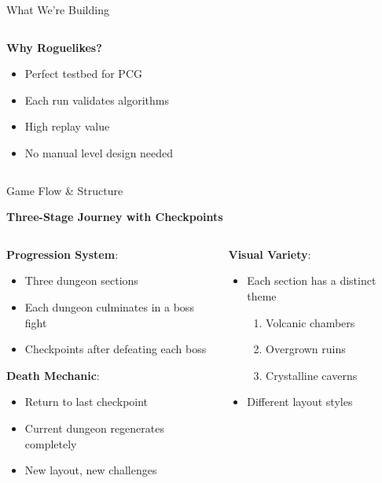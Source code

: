 \documentclass{beamer}
\begin{document}
\begin{frame}{What We're Building}
\begin{columns}[T]
\begin{column}{0.48\textwidth}
            \vspace{0.3cm}
            \textbf{Why Roguelikes?}
            \begin{itemize}
                \item Perfect testbed for PCG
                \item Each run validates algorithms
                \item High replay value
                \item No manual level design needed
            \end{itemize}
        \end{column}
    \end{columns}
\end{frame}

\begin{frame}{Game Flow \& Structure}
    \begin{center}
        \textbf{Three-Stage Journey with Checkpoints}
    \end{center}

    \begin{columns}[T]
        \begin{column}{0.48\textwidth}
            \textbf{Progression System}:
            \begin{itemize}
                \item Three dungeon sections
                \item Each dungeon culminates in a boss fight
                \item Checkpoints after defeating each boss
            \end{itemize}

            \vspace{0.35cm}
            \textbf{Death Mechanic}:
            \begin{itemize}
                \item Return to last checkpoint
                \item \textcolor{ubburgundy}{Current dungeon regenerates completely}
                \item New layout, new challenges
            \end{itemize}
        \end{column}

        \begin{column}{0.48\textwidth}
            \textbf{Visual Variety}:
            \begin{itemize}
                \item Each section has a distinct theme
                \begin{enumerate}
                    \item Volcanic chambers
                    \item Overgrown ruins
                    \item Crystalline caverns
                \end{enumerate}
                \item Different layout styles
            \end{itemize}


\end{column}
\end{columns}
\end{frame}
\end{document}
